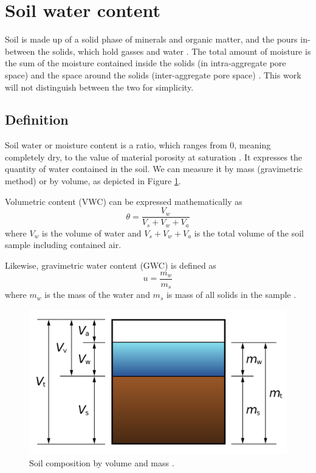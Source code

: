 \section{Soil water content}
Soil is made up of a solid phase of minerals and organic matter, and the pours in-between the solids, which hold gasses and water \cite{paul_soil_2007}. The total amount of moisture is the sum of the moisture contained inside the solids (in intra-aggregate pore space) and the space around the solids (inter-aggregate pore space) \cite{myjove_corporation_determination_2024}. This work will not distinguish between the two for simplicity.

\subsection{Definition}
Soil water or moisture content is a ratio, which ranges from 0, meaning completely dry, to the value of material porosity at saturation \cite{webster_humidity_1998}. It expresses the quantity of water contained in the soil. We can measure it by mass (gravimetric method) or by volume, as depicted in Figure \ref{fig:soil-phase-diagram}.

Volumetric content (VWC) can be expressed mathematically as
\begin{equation}
    \label{equation:volumetric-content} \theta = \dfrac{V_w}{V_s + V_w + V_a}
\end{equation}
where $V_w$ is the volume of water and $V_s + V_w + V_a$ is the total volume of the soil sample including contained air. 

Likewise, gravimetric water content (GWC) is defined as
\begin{equation}
    \label{equation:gravimetric-content} u = \dfrac{m_w}{m_s}
\end{equation}
where $m_w$ is the mass of the water and $m_s$ is mass of all solids in the sample \cite{edaphic_scientific_pty_ltd_how_2024}.

\begin{figure}
    \includegraphics[width=.5\textwidth]{fig/soil-phase-diagram.png}
    \caption{\label{fig:soil-phase-diagram} Soil composition by volume and mass \cite{noauthor_water_2023}.}
\end{figure}

